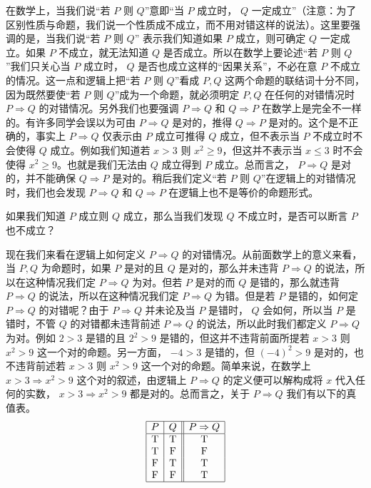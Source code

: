 在数学上，当我们说“若 \(P\) 则 \(Q\)”意即“当 \(P\) 成立时， \(Q\) 一定成立”（注意：为了区别性质与命题，我们说一个性质成不成立，而不用对错这样的说法）。这里要强调的是，当我们说“若 \(P\) 则 \(Q\)” 表示我们知道如果 \(P\) 成立，则可确定 \(Q\) 一定成立。如果 \(P\) 不成立，就无法知道 \(Q\) 是否成立。所以在数学上要论述“若 \(P\) 则 \(Q\)”我们只关心当 \(P\) 成立时， \(Q\) 是否也成立这样的“因果关系”，不必在意 \(P\) 不成立的情况。这一点和逻辑上把“若 \(P\) 则 \(Q\)”看成 \(P,Q\) 这两个命题的联结词十分不同，因为既然要使“若 \(P\) 则 \(Q\)”成为一个命题，就必须明定 \(P,Q\) 在任何的对错情况时 \(P\Rightarrow Q\) 的对错情况。另外我们也要强调 \(P\Rightarrow Q\) 和 \(Q\Rightarrow P\) 在数学上是完全不一样的。有许多同学会误以为可由 \(P\Rightarrow Q\) 是对的，推得 \(Q\Rightarrow P\) 是对的。这个是不正确的，事实上 \(P\Rightarrow Q\) 仅表示由 \(P\) 成立可推得 \(Q\) 成立，但不表示当 \(P\) 不成立时不会使得 \(Q\) 成立。例如我们知道若 \(x > 3\) 则 \(x^{2}\ge 9\)，但这并不表示当 \(x\le 3\) 时不会使得 \(x^{2}\ge 9\)。也就是我们无法由 \(Q\) 成立得到 \(P\) 成立。总而言之， \(P\Rightarrow Q\) 是对的，并不能确保 \(Q\Rightarrow P\) 是对的。稍后我们定义“若 \(P\) 则 \(Q\)”在逻辑上的对错情况时，我们也会发现 \(P\Rightarrow Q\) 和 \(Q\Rightarrow P\) 在逻辑上也不是等价的命题形式。

\begin{question}
如果我们知道 \(P\) 成立则 \(Q\) 成立，那么当我们发现 \(Q\) 不成立时，是否可以断言 \(P\) 也不成立？
\end{question}

现在我们来看在逻辑上如何定义 \(P\Rightarrow Q\) 的对错情况。从前面数学上的意义来看，当 \(P,Q\) 为命题时，如果 \(P\) 是对的且 \(Q\) 是对的，那么并未违背 \(P\Rightarrow Q\) 的说法，所以在这种情况我们定 \(P\Rightarrow Q\) 为对。但若 \(P\) 是对的而 \(Q\) 是错的，那么就违背 \(P\Rightarrow Q\) 的说法，所以在这种情况我们定 \(P\Rightarrow Q\) 为错。但是若 \(P\) 是错的，如何定 \(P\Rightarrow Q\) 的对错呢？由于 \(P\Rightarrow Q\) 并未论及当 \(P\) 是错时， \(Q\) 会如何，所以当 \(P\) 是错时，不管 \(Q\) 的对错都未违背前述 \(P\Rightarrow Q\) 的说法，所以此时我们都定义 \(P\Rightarrow Q\) 为对。例如 \(2 > 3\) 是错的且 \(2^{2} > 9\) 是错的，但这并不违背前面所提若 \(x > 3\) 则 \(x^{2} > 9\) 这一个对的命题。另一方面， \(- 4 > 3\) 是错的，但 \((- 4)^{2} > 9\) 是对的，也不违背前述若 \(x > 3\) 则 \(x^{2} > 9\) 这一个对的命题。简单来说，在数学上 \(x > 3\Rightarrow x^{2} > 9\) 这个对的叙述，由逻辑上 \(P\Rightarrow Q\) 的定义便可以解构成将 \(x\) 代入任何的实数， \(x > 3\Rightarrow x^{2} > 9\) 都是对的。总而言之，关于 \(P\Rightarrow Q\) 我们有以下的真值表。
\[
\begin{array}{|c|c||c|}
\hline
P & Q & P\Rightarrow Q \\
\hline
\mathrm{T} & \mathrm{T} & \mathrm{T} \\
\mathrm{T} & \mathrm{F} & \mathrm{F} \\
\mathrm{F} & \mathrm{T} & \mathrm{T} \\
\mathrm{F} & \mathrm{F} & \mathrm{T} \\
\hline
\end{array}
\]

